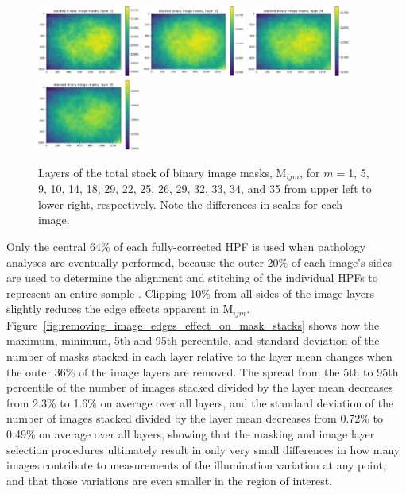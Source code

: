 \documentclass[letterpaper,11pt]{article}
\newcommand{\reffig}[1]{Figure~\ref{#1}}
\newcommand{\Mu}{\mathrm{M}}
\begin{document}
\begin{figure}[!ht]
\includegraphics[width=0.3\textwidth]{images/measuring_flatfield_corrections/mask_stack_layers/mask_stack_layer_32}
\includegraphics[width=0.3\textwidth]{images/measuring_flatfield_corrections/mask_stack_layers/mask_stack_layer_33}
\includegraphics[width=0.3\textwidth]{images/measuring_flatfield_corrections/mask_stack_layers/mask_stack_layer_34}
\includegraphics[width=0.3\textwidth]{images/measuring_flatfield_corrections/mask_stack_layers/mask_stack_layer_35}
\caption{\footnotesize Layers of the total stack of binary image masks, $\Mu_{ijm}$, for $m=$1, 5, 9, 10, 14, 18, 29, 22, 25, 26, 29, 32, 33, 34, and 35 from upper left to lower right, respectively. Note the differences in scales for each image.}
\label{fig:mask_stack_layers}
\end{figure}

Only the central 64\% of each fully-corrected HPF is used when pathology analyses are eventually performed, because the outer 20\% of each image's sides are used to determine the alignment and stitching of the individual HPFs to represent an entire sample \cite{Heshy}. Clipping 10\% from all sides of the image layers slightly reduces the edge effects apparent in $\Mu_{ijm}$. \reffig{fig:removing_image_edges_effect_on_mask_stacks} shows how the maximum, minimum, 5th and 95th percentile, and standard deviation of the number of masks stacked in each layer relative to the layer mean changes when the outer 36\% of the image layers are removed. The spread from the 5th to 95th percentile of the number of images stacked divided by the layer mean decreases from 2.3\% to 1.6\% on average over all layers, and the standard deviation of the number of images stacked divided by the layer mean decreases from 0.72\% to 0.49\% on average over all layers, showing that the masking and image layer selection procedures ultimately result in only very small differences in how many images contribute to measurements of the illumination variation at any point, and that those variations are even smaller in the region of interest.
\end{document}
